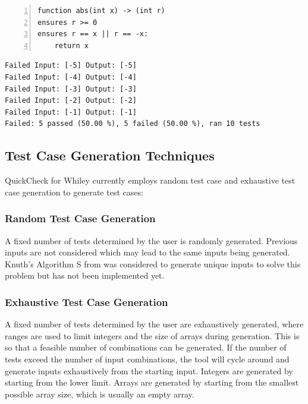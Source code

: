 \begin{lstlisting}[language=Whiley, tabsize=3, numbers=left,
label={lst:whileyAbs}, caption={Whiley program for an incorrect implementation of the abs function},
captionpos=b]
function abs(int x) -> (int r)
ensures r >= 0
ensures r == x || r == -x:
	return x
\end{lstlisting}

\begin{lstlisting}[label={lst:whileyQCResults},
caption={Results of executing the tool on Listing \ref{lst:whileyAbs}},
captionpos=b, frame=single ]
Failed Input: [-5] Output: [-5]
Failed Input: [-4] Output: [-4]
Failed Input: [-3] Output: [-3]
Failed Input: [-2] Output: [-2]
Failed Input: [-1] Output: [-1]
Failed: 5 passed (50.00 %), 5 failed (50.00 %), ran 10 tests
\end{lstlisting}

\subsection{Test Case Generation Techniques}

QuickCheck for Whiley currently employs random test case and exhaustive test case generation to generate test cases: 

\subsubsection{Random Test Case Generation}

A fixed number of tests determined by the user is randomly generated. Previous inputs are not considered which may lead to the same inputs being generated.
Knuth's Algorithm S from \cite{artProgv2} was considered to generate unique inputs to solve this problem but has not been implemented yet.

\subsubsection{Exhaustive Test Case Generation}
A fixed number of tests determined by the user are exhaustively generated, where ranges are used to limit integers and the size of arrays during generation. This is so that a feasible number of combinations can be generated. If the number of tests exceed the number of input combinations, the tool will cycle around and generate inputs exhaustively from the starting input. Integers are generated by starting from the lower limit. Arrays are generated by starting from the smallest possible array size, which is usually an empty array. 

